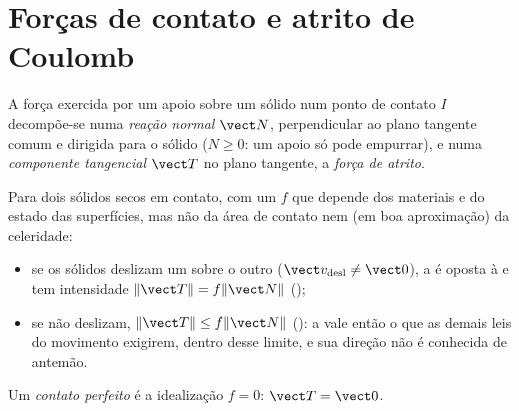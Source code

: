 \section{Forças de contato e atrito de Coulomb}

\begin{definition}\label{def:b2:rigid-body-mechanics:contact}
A força exercida por um apoio sobre um sólido num ponto de contato $I$
decompõe-se numa \emph{reação normal} $\vect N$, perpendicular ao plano
tangente comum e dirigida para o sólido ($N \ge 0$: um apoio só pode
empurrar), e numa \emph{componente tangencial} $\vect T$ no plano
tangente, a \emph{força de atrito}.
\end{definition}

\begin{theorem}\label{thm:b2:rigid-body-mechanics:coulomb}
Para dois sólidos secos em contato, com um \emph{} $f$
que depende dos materiais e do estado das superfícies, mas não da
área de contato nem (em boa aproximação) da celeridade:
\begin{itemize}
  \item se os sólidos deslizam um sobre o outro ($\vect v_{\text{desl}} \ne
        \vect 0$), a  é oposta à 
        e tem intensidade $\|\vect T\| = f\|\vect N\|$ ();
  \item se não deslizam, $\|\vect T\| \le f\|\vect N\|$ (): a  vale então o que as demais leis do
        movimento exigirem, dentro desse limite, e sua direção não é
        conhecida de antemão.
\end{itemize}
Um \emph{contato perfeito} é a idealização $f = 0$: $\vect T = \vect 0$.
\end{theorem}
\admitted

